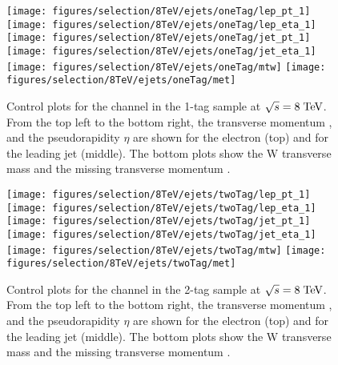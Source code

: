\begin{figure}
  \centering
  \texttt{[image: figures/selection/8TeV/ejets/oneTag/lep\_pt\_1]}
  \texttt{[image: figures/selection/8TeV/ejets/oneTag/lep\_eta\_1]}
  \texttt{[image: figures/selection/8TeV/ejets/oneTag/jet\_pt\_1]}
  \texttt{[image: figures/selection/8TeV/ejets/oneTag/jet\_eta\_1]}
  \texttt{[image: figures/selection/8TeV/ejets/oneTag/mtw]}
  \texttt{[image: figures/selection/8TeV/ejets/oneTag/met]}
  \caption[Control plots for the \ejets{} channel in the 1-tag
    sample at $\sqrt{s} = 8 \TeV{}$]{Control plots for the \ejets{} channel in the 1-tag
    sample at $\sqrt{s} = 8 \TeV{}$.  From the top left to the bottom right, the transverse
    momentum \pt{}, and the pseudorapidity $\eta$ are shown for the
    electron (top) and for the leading jet (middle). The bottom plots
    show the W transverse mass \mtw{} and the missing transverse
    momentum \met{}.
  }
  \label{fig:2012ele_1tag}
\end{figure}
%
\begin{figure}
  \centering
  \texttt{[image: figures/selection/8TeV/ejets/twoTag/lep\_pt\_1]}
  \texttt{[image: figures/selection/8TeV/ejets/twoTag/lep\_eta\_1]}
  \texttt{[image: figures/selection/8TeV/ejets/twoTag/jet\_pt\_1]}
  \texttt{[image: figures/selection/8TeV/ejets/twoTag/jet\_eta\_1]}
  \texttt{[image: figures/selection/8TeV/ejets/twoTag/mtw]}
  \texttt{[image: figures/selection/8TeV/ejets/twoTag/met]}
  \caption[Control plots for the \ejets{} channel in the 2-tag
    sample at $\sqrt{s} = 8 \TeV{}$]{Control plots for the \ejets{} channel in the 2-tag
    sample at $\sqrt{s} = 8 \TeV{}$.  From the top left to the bottom right, the transverse
    momentum \pt{}, and the pseudorapidity $\eta$ are shown for the
    electron (top) and for the leading jet (middle). The bottom plots
    show the W transverse mass \mtw{} and the missing transverse
    momentum \met{}. 
  }
  \label{fig:2012ele_2tag}
\end{figure}



